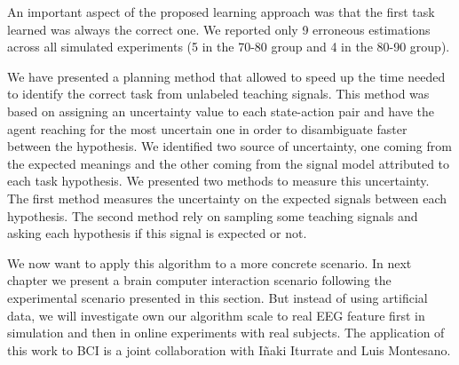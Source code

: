 An important aspect of the proposed learning approach was that the first task learned was always the correct one. We reported only 9 erroneous estimations across all simulated experiments (5 in the 70-80 group and 4 in the 80-90 group).


\transition

We have presented a planning method that allowed to speed up the time needed to identify the correct task from unlabeled teaching signals. This method was based on assigning an uncertainty value to each state-action pair and have the agent reaching for the most uncertain one in order to disambiguate faster between the hypothesis. We identified two source of uncertainty, one coming from the expected meanings and the other coming from the signal model attributed to each task hypothesis. We presented two methods to measure this uncertainty. The first method measures the uncertainty on the expected signals between each hypothesis. The second method rely on sampling some teaching signals and asking each hypothesis if this signal is expected or not.

We now want to apply this algorithm to a more concrete scenario. In next chapter we present a brain computer interaction scenario following the experimental scenario presented in this section. But instead of using artificial data, we will investigate own our algorithm scale to real EEG feature first in simulation and then in online experiments with real subjects. The application of this work to BCI is a joint collaboration with I{\~n}aki Iturrate and Luis Montesano.
